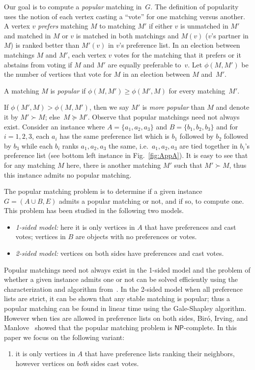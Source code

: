 \documentclass[11pt]{llncs}
\begin{document}
Our goal is to compute a {\em popular} matching in~$G$. The definition of popularity uses the 
notion of each vertex casting a ``vote'' for one matching versus another. A vertex $v$ 
{\em prefers} matching $M$ to matching $M'$ if either $v$ is unmatched in $M'$ and matched in 
$M$ or $v$ is matched in both matchings and $M(v)$ ($v$'s partner in $M$) is ranked better 
than $M'(v)$ in $v$'s preference list. In an election between matchings $M$ and $M'$, each 
vertex $v$ votes for the matching that it prefers or it abstains from voting if $M$ and $M'$ 
are equally preferable to~$v$. Let $\phi(M,M')$ be the number of vertices that vote for $M$ in 
an election between $M$ and~$M'$.

\begin{definition}
A matching $M$ is \emph{popular} if $\phi(M,M') \ge \phi(M',M)$ for every matching~$M'$.
\end{definition}

If $\phi(M',M) > \phi(M,M')$, then we say $M'$ is {\em more popular} than $M$ and denote it by 
$M' \succ M$; else~$M \succeq M'$. Observe that popular matchings need not always exist. 
Consider an instance where $A = \{a_1,a_2,a_3\}$ and $B = \{b_1,b_2,b_3\}$ and for $i = 1,2,3$, 
each $a_i$ has the same preference list which is $b_1$ followed by $b_2$ followed by $b_3$ 
while each $b_i$ ranks $a_1,a_2,a_3$ the same, i.e.\ $a_1,a_2,a_3$ are tied together in $b_i$'s 
preference list (see bottom left instance in Fig.~\ref{fig:AppA}). It is easy to see that for any matching $M$ 
here, there is another matching $M'$ such that $M' \succ M$, thus this instance admits no 
popular matching.

The popular matching problem is to determine if a given instance $G = (A\cup B,E)$ admits a 
popular matching or not, and if so, to compute one. This problem has been studied in the 
following two models.
\begin{itemize}
\item {\em 1-sided model:} here it is only vertices in $A$ that have preferences and cast 
votes; vertices in $B$ are objects with no preferences or votes.
\item {\em 2-sided model:} vertices on both sides have preferences and cast votes.
\end{itemize}

Popular matchings need not always exist in the 1-sided model and the problem of whether a 
given instance admits one or not can be solved efficiently using the characterization and 
algorithm from~\cite{AIKM05}. In the 2-sided model when all preference lists are strict, it 
can be shown that any stable matching is popular; thus a popular matching can be 
found in linear time using the Gale-Shapley algorithm. However when ties are allowed in 
preference lists on both sides, Bir\'o, Irving, and Manlove~\cite{BIM09} showed that the 
popular matching problem is $\mathsf{NP}$-complete. In this paper we focus on the following 
variant:
\begin{enumerate} [$\ast$]
\item it is only vertices in $A$ that have preference lists ranking their neighbors, 
however vertices on {\em both} sides cast votes.
\end{enumerate}
\end{document}
